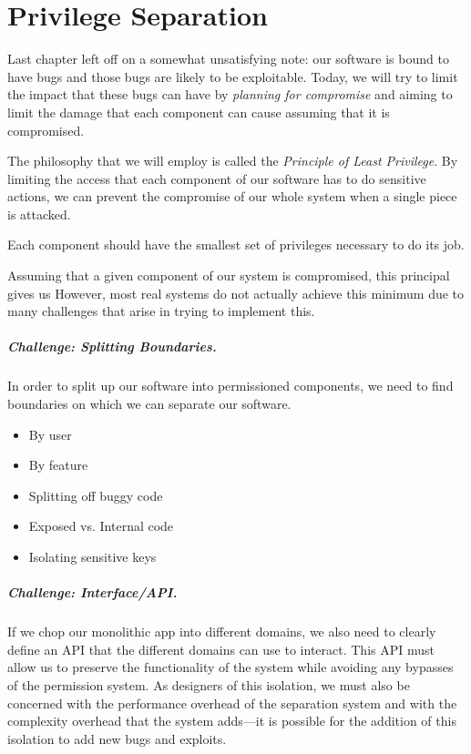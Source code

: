 \chapter{Privilege Separation}

Last chapter left off on a somewhat unsatisfying note: our software is bound to have bugs and those bugs are likely to be exploitable. Today, we will try to limit the impact that these bugs can have by \emph{planning for compromise} and aiming to limit the damage that each component can cause assuming that it is compromised.

The philosophy that we will employ is called the \emph{Principle of Least Privilege}. By limiting the access that each component of our software has to do sensitive actions, we can prevent the compromise of our whole system when a single piece is attacked.

\begin{definition}
	Each component should have the smallest set of privileges necessary to do its job.	
\end{definition}

Assuming that a given component of our system is compromised, this principal gives us  However, most real systems do not actually achieve this minimum due to many challenges that arise in trying to implement this. 

\paragraph{Challenge: Splitting Boundaries.} In order to split up our software into permissioned components, we need to find boundaries on which we can separate our software. 
\begin{itemize}
	\item By user
	\item By feature
	\item Splitting off buggy code
	\item Exposed vs. Internal code
	\item Isolating sensitive keys
\end{itemize}

\paragraph{Challenge: Interface/API.} If we chop our monolithic app into different domains, we also need to clearly define an API that the different domains can use to interact. This API must allow us to preserve the functionality of the system while avoiding any bypasses of the permission system. As designers of this isolation, we must also be concerned with the performance overhead of the separation system and with the complexity overhead that the system adds---it is possible for the addition of this isolation to add new bugs and exploits.

